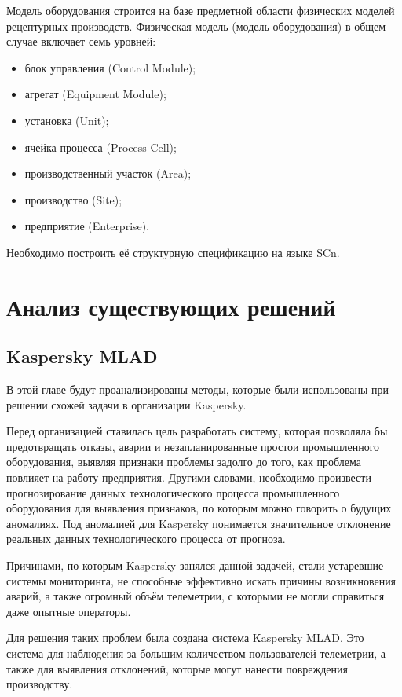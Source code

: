 Модель оборудования строится на базе предметной области физических моделей рецептурных производств. Физическая модель (модель оборудования) в общем случае включает семь уровней:

\begin{itemize}
    \item блок управления (Control Module);
    \item агрегат (Equipment Module);
    \item установка (Unit);
    \item ячейка процесса (Process Cell);
    \item производственный участок (Area);
    \item производство (Site);
    \item предприятие (Enterprise).
\end{itemize}

Необходимо построить её структурную спецификацию на языке SCn.

\section{Анализ существующих решений}

\subsection{Kaspersky MLAD}

В этой главе будут проанализированы методы, которые были использованы при решении схожей задачи в организации Kaspersky.

Перед организацией ставилась цель разработать систему, которая позволяла бы предотвращать отказы, аварии и незапланированные простои промышленного оборудования, выявляя признаки проблемы задолго до того, как проблема повлияет на работу предприятия. Другими словами, необходимо произвести прогнозирование данных технологического процесса промышленного оборудования для выявления признаков, по которым можно говорить о будущих аномалиях. Под аномалией для Kaspersky понимается значительное отклонение реальных данных технологического процесса от прогноза.

Причинами, по которым Kaspersky занялся данной задачей, стали устаревшие системы мониторинга, не способные эффективно искать причины возникновения аварий, а также огромный объём телеметрии, с которыми не могли справиться даже опытные операторы.

Для решения таких проблем была создана система Kaspersky MLAD. Это система для наблюдения за большим количеством пользователей телеметрии, а также для выявления отклонений, которые могут нанести повреждения производству.

